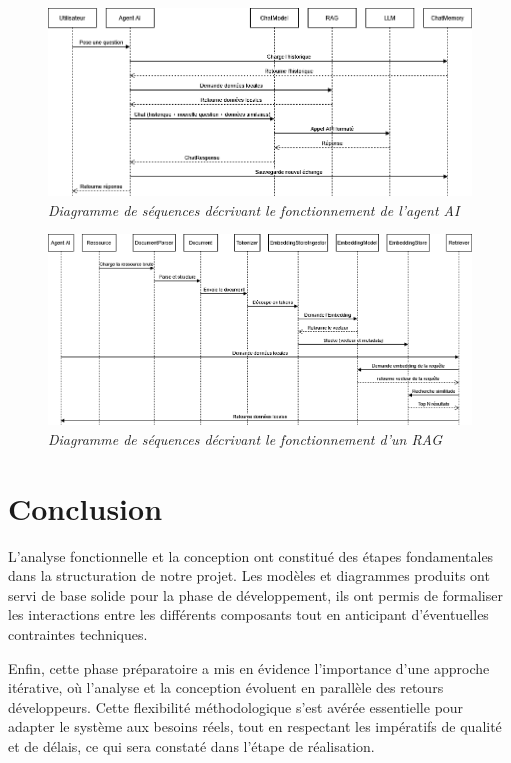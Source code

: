 \documentclass[12pt,a4paper]{report}
\begin{document}
	\begin{figure}[H]
		\centering
		\includegraphics[width=1\textwidth]{ds-ai-agent.drawio.png}
		\caption{\textit{Diagramme de séquences décrivant le fonctionnement de l'agent AI}}
		\label{fig:ds-ai-agent}
	\end{figure}
	
	\begin{figure}[H]
		\centering
		\includegraphics[width=1\textwidth]{ds-rag.drawio.png}
		\caption{\textit{Diagramme de séquences décrivant le fonctionnement d'un RAG}}
		\label{fig:ds-rag.drawio}
	\end{figure}
	
	\section{Conclusion}
	
	L’analyse fonctionnelle et la conception ont constitué des étapes fondamentales dans la structuration de notre projet. Les modèles et diagrammes produits ont servi de base solide pour la phase de développement, ils ont permis de formaliser les interactions entre les différents composants tout en anticipant d’éventuelles contraintes techniques.
	
	Enfin, cette phase préparatoire a mis en évidence l’importance d’une approche itérative, où l’analyse et la conception évoluent en parallèle des retours développeurs. Cette flexibilité méthodologique s’est avérée essentielle pour adapter le système aux besoins réels, tout en respectant les impératifs de qualité et de délais, ce qui sera constaté dans l'étape de réalisation.
	
\end{document}
